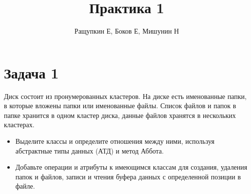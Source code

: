 \documentclass{article}
\begin{document}
\title{Практика 1}
\author{Ращупкин Е, Боков Е, Мишунин Н}
\maketitle

\section{Задача 1}
Диск состоит из пронумерованных кластеров. На диске есть именованные папки, в которые вложены папки или именованные файлы. Список файлов и папок в папке хранится в одном кластер диска, данные файлов хранятся в нескольких кластерах.

\begin{itemize}
    \item Выделите классы и определите отношения между ними, используя абстрактные типы данных (АТД) и метод Аббота.
    \item Добавьте операции и атрибуты к имеющимся классам для создания, удаления папок и файлов, записи и чтения буфера данных с определенной позиции в файле.
\end{itemize}
\end{document}
